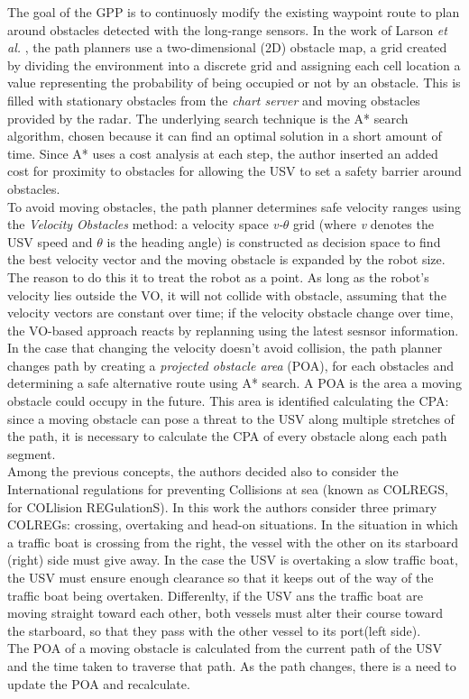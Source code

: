 \documentclass[journal]{IEEEtran}
\begin{document}
              The goal of the GPP is to continuosly modify the existing waypoint route to plan around obstacles detected with the long-range sensors. In the work of Larson \textit{et al.} \cite{Larson2007,Larson2007a}, the path planners use a two-dimensional (2D) obstacle map, a grid created by dividing the environment into a discrete grid and assigning each cell location a value representing the probability of being occupied or not by an obstacle. This is filled with stationary obstacles from the \textit{chart server} and moving obstacles provided by the radar. The underlying search technique is the A* search algorithm, chosen because it can find an optimal solution in a short amount of time. Since A* uses a cost analysis at each step, the author inserted an added cost for proximity to obstacles for allowing the USV to set a safety barrier around obstacles.\\
              To avoid moving obstacles, the path planner determines safe velocity ranges using the \textit{Velocity Obstacles} method: a velocity space \textit{v-$\theta$} grid (where \textit{v} denotes the USV speed and \textit{$\theta$} is the heading angle) is constructed as decision space to find the best velocity vector and the moving obstacle is expanded by the robot size. The reason to do this it to treat the robot as a point. As long as the robot's velocity lies outside the VO, it will not collide with obstacle, assuming that the velocity vectors are constant over time; if the velocity obstacle change over time, the VO-based approach reacts by replanning using the latest sesnsor information.\\
              In the case that changing the velocity doesn't avoid collision, the path planner changes path by creating a \textit{projected obstacle area} (POA), for each obstacles and determining a safe alternative route using A* search. A POA is the area a moving obstacle could occupy in the future. This area is identified calculating the CPA: since a moving obstacle can pose a threat to the USV along multiple stretches of the path, it is necessary to calculate the CPA of every obstacle along each path segment.\\
              Among the previous concepts, the authors decided also to consider the International regulations for preventing Collisions at sea (known as COLREGS, for COLlision REGulationS). In this work the authors consider three primary COLREGs: crossing, overtaking and head-on situations. In the situation in which a traffic boat is crossing from the right, the vessel with the other on its starboard (right) side must give away. In the case the USV is overtaking a slow traffic boat, the USV must ensure enough clearance so that it keeps out of the way of the traffic boat being overtaken. Differenlty, if the USV ans the traffic boat are moving straight toward each other, both vessels must alter their course toward the starboard, so that they pass with the other vessel to its port(left side).\\
              The POA of a moving obstacle is calculated from the current path of the USV and the time taken to traverse that path. As the path changes, there is a need to update the POA and recalculate.\\
\end{document}
